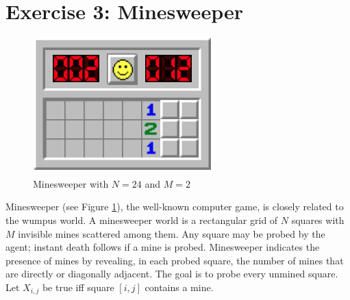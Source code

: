 \documentclass[9pt,a4paper]{extarticle}
\begin{document}
 \section*{Exercise 3: Minesweeper}
 \begin{figure}[h]
     \centering
     \includegraphics[width=.35\textwidth]{figures/minesweeper.png}
     \caption{Minesweeper with $N = 24$ and $M=2$}
     \label{fig:minesweeper}
 \end{figure}
Minesweeper (see Figure \ref{fig:minesweeper}), the well-known computer game, is closely related to the wumpus world. A minesweeper world is a rectangular grid of $N$ squares with $M$ invisible mines scattered among them. Any square may be probed by the agent; instant death follows if a mine is probed. Minesweeper indicates the presence of mines by revealing, in each probed square, the number of mines that are directly or diagonally adjacent. The goal is to probe every unmined square. Let $X_{i,j}$ be true iff square $\left[i, j\right]$ contains a mine. 
\end{document}
